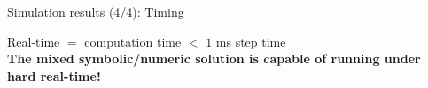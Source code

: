 \begin{frame}{Simulation results (4/4): Timing}
  \begin{center}
    Real-time $=$ computation time $<$ $1$ ms step time \\[1.0em]
    \textcolor{mycolor1}{\textbf{The mixed symbolic/numeric solution is capable of running under hard real-time!}} \\[2.0em]
  \end{center}
\end{frame}


